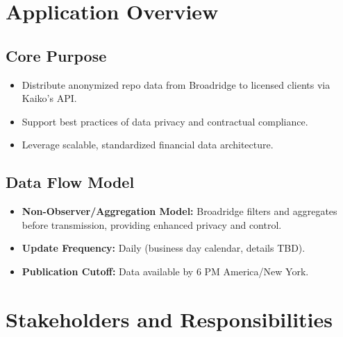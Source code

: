 \documentclass[12pt,a4paper]{article}
\begin{document}
\section{Application Overview}

\subsection*{Core Purpose}
\begin{itemize}[leftmargin=*]
    \item Distribute anonymized repo data from Broadridge to licensed clients via Kaiko's API.
    \item Support best practices of data privacy and contractual compliance.
    \item Leverage scalable, standardized financial data architecture.
\end{itemize}

\subsection*{Data Flow Model}
\begin{itemize}[leftmargin=*]
    \item \textbf{Non-Observer/Aggregation Model:} Broadridge filters and aggregates before transmission, providing enhanced privacy and control.
    \item \textbf{Update Frequency:} Daily (business day calendar, details TBD).
    \item \textbf{Publication Cutoff:} Data available by 6 PM America/New York.
\end{itemize}

\section{Stakeholders and Responsibilities}
\end{document}
